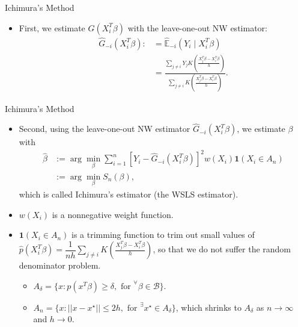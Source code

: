 \documentclass[xcolor=svgnames,dvipdfmx,cjk]{beamer}
\theoremstyle{example}
\begin{document}
\begin{frame}{Ichimura's Method}
  \begin{itemize}
  \item First, we estimate $G(X_i^{T}\beta)$  
        with the leave-one-out NW estimator:
        \begin{align*}
          \hat{G}_{-i}(X_i^{T}\beta) 
              :&= \hat{\mathbb{E}}_{-i}(Y_i \mid X_i^{T} \beta) \\
               &= \frac
                  {\sum_{j \neq i} Y_j 
                   K \left( \frac
                            {X_j^{T}\beta - X_i^{T}\beta}
                            {h} 
                     \right) 
                  }
                  {\sum_{j \neq i} 
                   K \left( \frac
                           {X_j^{T}\beta - X_i^{T}\beta}
                           {h} 
                     \right) 
                  }.
        \end{align*}
\end{itemize}
\end{frame}

\begin{frame}{Ichimura's Method}
  \begin{itemize}
    \item Second, 
          using the leave-one-out NW estimator $\hat{G}_{-i}(X_i^{T}\beta)$,
          we estimate $\beta$ with
          \begin{align*}
            \hat{\beta} 
              &:= \arg \min_{\beta} 
                    \sum_{i=1}^{n}  
                          \left[ Y_i - \hat{G}_{-i}(X_i^{T}\beta) \right]^2 
                          w(X_i) \mathbf{1}(X_i \in A_n) \\
              &:= \arg \min_{\beta} 
                  S_n(\beta),
          \end{align*}
          which is called \alert{Ichimura's estimator (the WSLS estimator)}.
    \item  $w(X_i)$ is a nonnegative weight function.
    \item  $\mathbf{1}(X_i \in A_n)$ is a trimming function to trim out small values of 
           $\hat{p}(X_i^{T}\beta) 
           =
           \dfrac{1}{nh} \sum_{j \neq i} 
              K \left( \frac
                       {X_j^{T}\beta - X_i^{T}\beta}
                       {h} 
                \right) $,
           so that we do not suffer the random denominator problem. 
        \begin{itemize}
          \item $A_\delta = \{ x: p(x^{T}\beta) \geq \delta, \text{ for } ^\forall \beta \in \mathcal{B}\}$.
          \item $A_n = \{ x: || x - x^{\star} || \leq 2h, \text{ for } ^\exists x^{\star} \in A_\delta \}$, 
                which shrinks to $A_\delta$ as $n \to \infty$ and $h \to 0$.
        \end{itemize}
  \end{itemize}
\end{frame}
\end{document}
